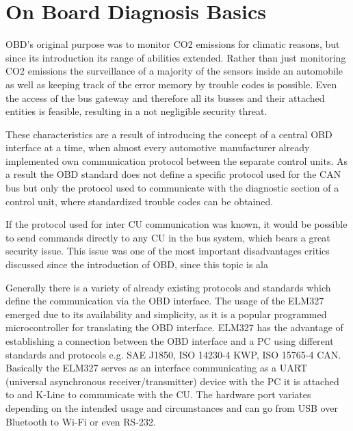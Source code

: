 

\chapter{On Board Diagnosis Basics}
\label{sec:OBDBASICS}
OBD's original purpose was to monitor CO2 emissions for climatic reasons, but since its introduction its range of abilities 
extended. Rather than just monitoring CO2 emissions the surveillance of a majority of the sensors inside an automobile as well as 
keeping track of the error memory by trouble codes is possible. Even the access of the bus gateway and therefore all its busses and 
their attached entities is feasible, resulting in a not negligible security threat. 

These characteristics are a result of introducing the concept of a central OBD interface at a time, 
when almost every automotive manufacturer already implemented own communication protocol between the separate control units.\cite{SCHAFOBD1}
As a result the OBD standard does not define a specific protocol used for the CAN bus but only the protocol used to communicate with the diagnostic 
section of a control unit, where standardized trouble codes can be obtained. 

If the protocol used for inter CU communication was known, it would be possible to send commands directly to any CU in the bus system, which bears a 
great security issue. This issue was one of the most important disadvantages critics discussed since the introduction of OBD, since this topic
is ala

Generally there is a variety of already existing protocols and standards which define the communication via the OBD interface. The usage of the ELM327 
emerged due to its availability and simplicity, as it is a popular programmed microcontroller for translating the OBD interface. ELM327 has the 
advantage of establishing a connection between the OBD interface and a PC using different standards and protocols e.g. SAE J1850, ISO 14230-4 KWP, 
ISO 15765-4 CAN. Basically the ELM327 serves as an interface communicating as a UART (universal asynchronous receiver/transmitter) device with the 
PC it is attached to and K-Line to communicate with the CU. The hardware port variates depending on the intended usage and circumstances and can go 
from USB over Bluetooth to Wi-Fi or even RS-232. 

